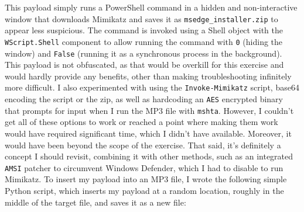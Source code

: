 \documentclass[a4paper]{article}
\newcommand{\abc}{\hfill \break}
\begin{document}
This payload simply runs a PowerShell command in a hidden and non-interactive window that downloads Mimikatz and saves it as \texttt{msedge\_installer.zip} to appear less suspicious. The command is invoked using a Shell object with the \texttt{WScript.Shell} component to allow running the command with \texttt{0} (hiding the window) and \texttt{False} (running it as a synchronous process in the background). This payload is not obfuscated, as that would be overkill for this exercise and would hardly provide any benefits, other than making troubleshooting infinitely more difficult. I also experimented with using the \texttt{Invoke-Mimikatz} script, base64 encoding the script or the zip, as well as hardcoding an \texttt{AES} encrypted binary that prompts for input when I run the MP3 file with \texttt{mshta}. However, I couldn’t get all of these options to work or reached a point where making them work would have required significant time, which I didn't have available. Moreover, it would have been beyond the scope of the exercise. That said, it's definitely a concept I should revisit, combining it with other methods, such as an integrated \texttt{AMSI} patcher to circumvent Windows Defender, which I had to disable to run Mimikatz. \cite{noauthor_amsi_nodate} \newpage \abc
To insert my payload into an MP3 file, I wrote the following simple Python script, which inserts my payload at a random location, roughly in the middle of the target file, and saves it as a new file:
\end{document}
